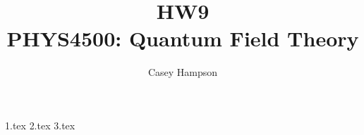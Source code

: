 \documentclass[titlepage]{article}
\title{HW9 \\[5pt] PHYS4500: Quantum Field Theory}
\author{Casey Hampson}
\begin{document}
    \maketitle
    \pagebreak

    {1.tex}
    {2.tex} 
    {3.tex}
\end{document}
